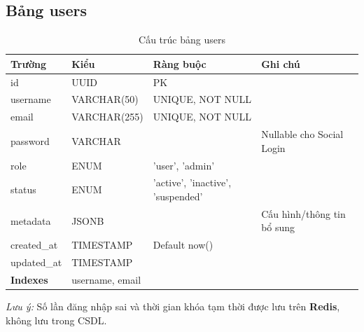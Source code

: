 \documentclass[12pt,a4paper]{article}
\begin{document}
\subsection{Bảng users}
\begin{longtable}{|l|l|l|p{5cm}|}
    \caption{Cấu trúc bảng users}                                                                                            \\
    \hline
    \rowcolor{headerblue}
    \textbf{Trường}  & \textbf{Kiểu}                        & \textbf{Ràng buộc}                & \textbf{Ghi chú}           \\
    \hline
    id               & UUID                                 & PK                                &                            \\
    \hline
    username         & VARCHAR(50)                          & UNIQUE, NOT NULL                  &                            \\
    \hline
    email            & VARCHAR(255)                         & UNIQUE, NOT NULL                  &                            \\
    \hline
    password         & VARCHAR                              &                                   & Nullable cho Social Login  \\
    \hline
    role             & ENUM                                 & 'user', 'admin'                   &                            \\
    \hline
    status           & ENUM                                 & 'active', 'inactive', 'suspended' &                            \\
    \hline
    metadata         & JSONB                                &                                   & Cấu hình/thông tin bổ sung \\
    \hline
    created\_at      & TIMESTAMP                            & Default now()                     &                            \\
    \hline
    updated\_at      & TIMESTAMP                            &                                   &                            \\
    \hline
    \rowcolor{headerblue}
    \textbf{Indexes} & \multicolumn{3}{l|}{username, email}                                                                  \\
    \hline
\end{longtable}

\textit{Lưu ý:} Số lần đăng nhập sai và thời gian khóa tạm thời được lưu trên \textbf{Redis}, không lưu trong CSDL.
\end{document}

